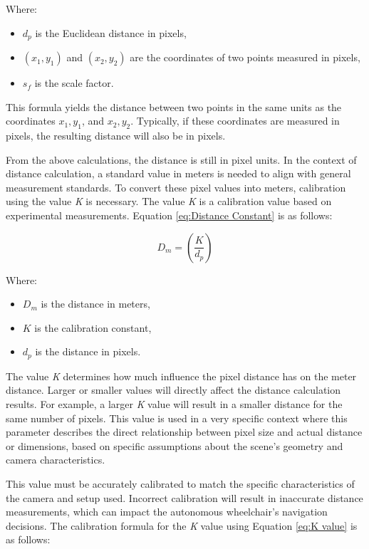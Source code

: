 Where:
\begin{itemize}
\item $d_p$ is the Euclidean distance in pixels,
\item $(x_1, y_1)$ and $(x_2, y_2)$ are the coordinates of two points measured in pixels,
\item $s_f$ is the scale factor.
\end{itemize}

This formula yields the distance between two points in the same units as the coordinates $x_1, y_1$, and $x_2, y_2$. Typically, if these coordinates are measured in pixels, the resulting distance will also be in pixels.

From the above calculations, the distance is still in pixel units. In the context of distance calculation, a standard value in meters is needed to align with general measurement standards. To convert these pixel values into meters, calibration using the value \emph{K} is necessary. The value \emph{K} is a calibration value based on experimental measurements. Equation \ref{eq:Distance Constant} is as follows:

\begin{equation}
\label{eq:Distance Constant}
D_m = \left(\frac{K}{{d_p}}\right)
\end{equation}

Where:
\begin{itemize}
\item $D_m$ is the distance in meters,
\item $K$ is the calibration constant,
\item $d_p$ is the distance in pixels.
\end{itemize}

The value \emph{K} determines how much influence the pixel distance has on the meter distance. Larger or smaller values will directly affect the distance calculation results. For example, a larger \emph{K} value will result in a smaller distance for the same number of pixels. This value is used in a very specific context where this parameter describes the direct relationship between pixel size and actual distance or dimensions, based on specific assumptions about the scene's geometry and camera characteristics.

This value must be accurately calibrated to match the specific characteristics of the camera and setup used. Incorrect calibration will result in inaccurate distance measurements, which can impact the autonomous wheelchair's navigation decisions. The calibration formula for the \emph{K} value using Equation \ref{eq:K value} is as follows:


